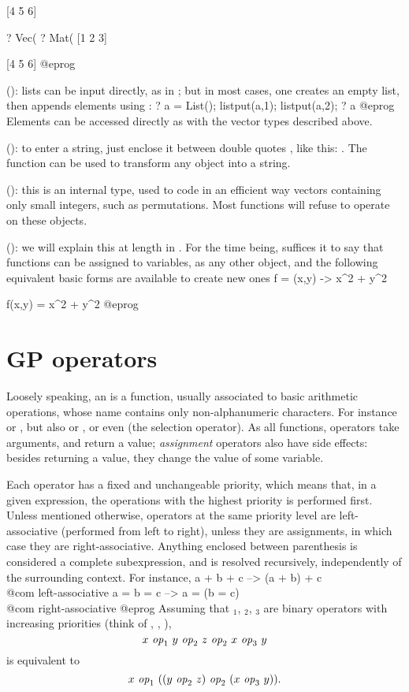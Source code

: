 [4 5 6]

? Vec(%
? Mat(%
[1 2 3]

[4 5 6]
@eprog

 (): lists can be input
directly, as in ; but in most cases, one creates
an empty list, then appends elements using :
\bprog
  ? a = List(); listput(a,1); listput(a,2);
  ? a
@eprog\noindent
Elements can be accessed directly as with the vector types described above.

 (): to
enter a string, just enclose it between double quotes , like this:
. The function  can be used to transform any
object into a string.

 (): this is an internal type,
used to code in an efficient way vectors containing only small integers, such
as permutations. Most  functions will refuse to operate on these
objects.

 (): we will explain this at length in
. For the time being, suffices it to say that
functions can be assigned to variables, as any other object, and the
following equivalent basic forms are available to create new ones
\bprog
  f = (x,y) -> x^2 + y^2

  f(x,y) = x^2 + y^2
@eprog

\section{GP operators}\label{se:operators}

\noindent Loosely speaking, an  is a function, usually
associated to basic arithmetic operations, whose name contains only
non-alphanumeric characters. For instance \kbd{+} or \kbd{-}, but also
\kbd{=} or \kbd{+=}, or even \kbd{[ ]} (the selection operator). As all
functions, operators take arguments, and return a value; \emph{assignment}
operators also have side effects: besides returning a value, they change the
value of some variable.

Each operator has a fixed and unchangeable priority, which means that, in
a given expression, the operations with the highest priority is performed
first. Unless mentioned otherwise, operators at the same priority level are
left-associative (performed from left to right), unless they are assignments,
in which case they are right-associative. Anything enclosed between
parenthesis is considered a complete subexpression, and is resolved
recursively, independently of the surrounding context. For instance,
\bprog
  a + b + c    -->   (a + b) + c     \\@com left-associative
  a = b = c    -->   a = (b = c)     \\@com right-associative
@eprog\noindent
Assuming that $_1$, $_2$, $_3$ are
binary operators with increasing priorities (think of \kbd{+},
\kbd{*}, \kbd{\pow}),
$$ x~\hbox{\it op\/}_1~y~\hbox{\it op\/}_2~z~\hbox{\it op\/}_2~x~\hbox{\it op\/}_3~y $$ is
equivalent to $$ x~\hbox{\it op\/}_1~((y~\hbox{\it op\/}_2~z)~\hbox{\it op\/}_2~
(x~\hbox{\it op\/}_3~y)).$$

